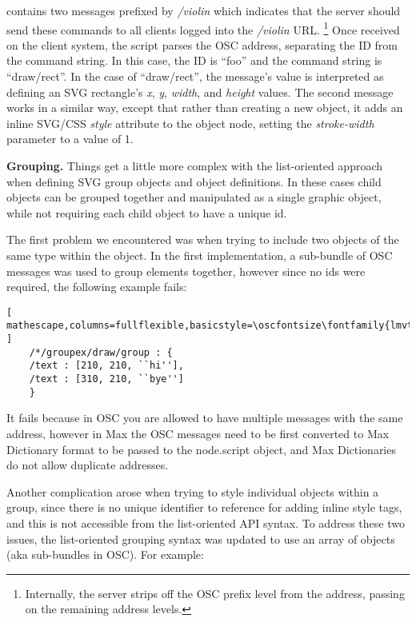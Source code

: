 \noindent
contains two messages prefixed by \textit{/violin} which indicates that the server should send these commands to all clients logged into the \textit{/violin} URL. \footnote{Internally, the server strips off the OSC prefix level from the address, passing on the remaining address levels.} Once received on the client system, the script parses the OSC address, separating the ID from the command string. In this case, the ID is ``foo'' and the command string is ``draw/rect''.
In the case of ``draw/rect'', the message's value is interpreted as defining an SVG rectangle's \textit{x},  \textit{y},  \textit{width}, and \textit{height} values.
The second message works in a similar way, except that rather than creating a new object, it adds an inline SVG/CSS \textit{style} attribute to the object node, setting the \textit{stroke-width} parameter to a value of 1.

\medskip
\noindent
\textbf{Grouping.} 
Things get a little more complex with the list-oriented approach when defining SVG group objects and object definitions. 
In these cases child objects can be grouped together and manipulated as a single graphic object, while not requiring each child object to have a unique id.

The first problem we encountered was when trying to include two objects of the same type within the object. 
In the first implementation, a sub-bundle of OSC messages was used to group elements together, however since no ids were required, the following example fails:

\begin{lstlisting}[ mathescape,columns=fullflexible,basicstyle=\oscfontsize\fontfamily{lmvtt}\selectfont ]
    /*/groupex/draw/group : {
	/text : [210, 210, ``hi''],
	/text : [310, 210, ``bye'']
    }
\end{lstlisting}

\noindent
It fails because in OSC you are allowed to have multiple messages with the same address, however in Max the OSC messages need to be first converted to Max Dictionary format to be passed to the node.script object, and Max Dictionaries do not allow duplicate addresses.

Another complication arose when trying to style individual objects within a group, since there is no unique identifier to reference for adding inline style tags, and this is not accessible from the list-oriented API syntax. To address these two issues, the list-oriented grouping syntax was updated to use an array of objects (aka sub-bundles in OSC). For example:
 
